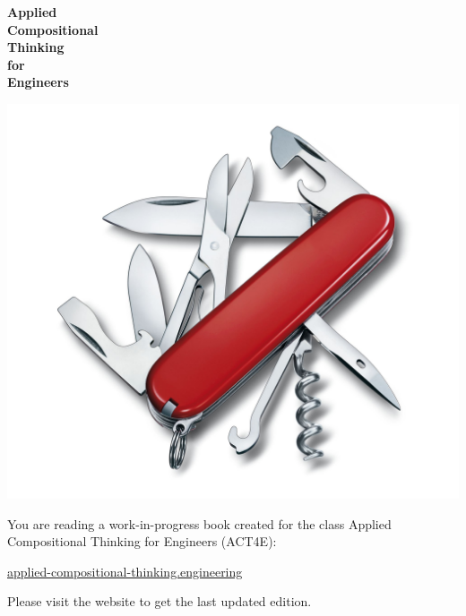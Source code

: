 
\begin{center}

\vspace{3cm}
{\huge\bfseries Applied\\Compositional\\Thinking \\[3mm]for\\[1mm] Engineers}


\end{center}

\vspace{3cm}
\begin{center}
    \includegraphics[width=0.5\linewidth]{pics/knife.jpg}
\end{center}


\vfill

You are reading a work-in-progress book created for the
class Applied Compositional Thinking for Engineers (ACT4E):

\href{https://applied-compositional-thinking.engineering}{applied-compositional-thinking.engineering}

Please visit the website to get the last updated edition.
